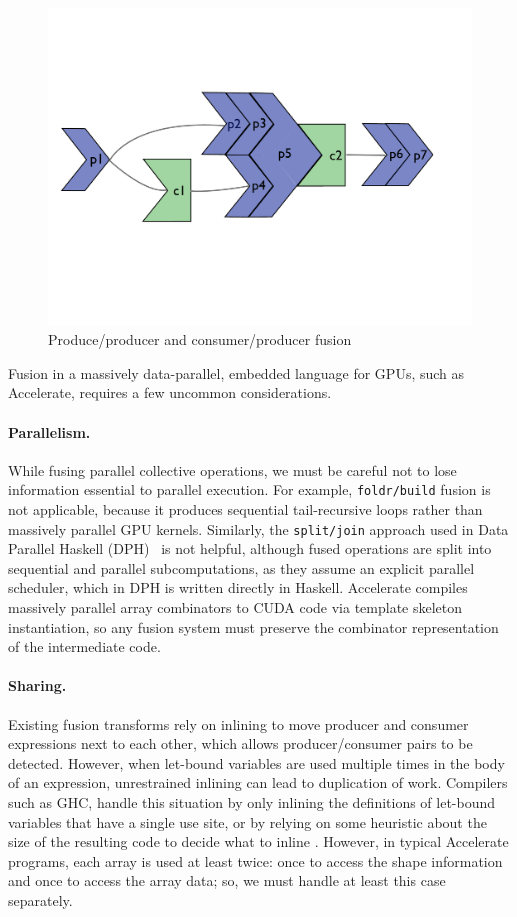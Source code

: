 \begin{figure}
\includegraphics[scale=0.175]{figs/fusion3.pdf}
\caption{Produce/producer and consumer/producer fusion}
\label{fig:Fusion}
\end{figure}

Fusion in a massively data-parallel, embedded language for GPUs, such as Accelerate, requires a few uncommon considerations.

\paragraph{Parallelism.} While fusing parallel collective operations, we must be careful not to lose information essential to parallel execution. For example, \texttt{foldr/build} fusion \cite{Gill:1993de} is not applicable, because it produces sequential tail-recursive loops rather than massively parallel GPU kernels. Similarly, the \texttt{split/join} approach used in Data Parallel Haskell (DPH)~\cite{Keller:distributed-types} is not helpful, although fused operations are split into sequential and parallel subcomputations, as they assume an explicit parallel scheduler, which in DPH is written directly in Haskell. Accelerate compiles massively parallel array combinators to CUDA code via template skeleton instantiation, so any fusion system must preserve the combinator representation of the intermediate code. 

\paragraph{Sharing.} Existing fusion transforms rely on inlining to move producer and consumer expressions next to each other, which allows producer/consumer pairs to be detected. However, when let-bound variables are used multiple times in the body of an expression, unrestrained inlining can lead to duplication of work. Compilers such as GHC, handle this situation by only inlining the definitions of let-bound variables that have a single use site, or by relying on some heuristic about the size of the resulting code to decide what to inline \cite{PeytonJones:Inliner}. However, in typical Accelerate programs, each array is used at least twice: once to access the shape information and once to access the array data; so, we must handle at least this case separately.

